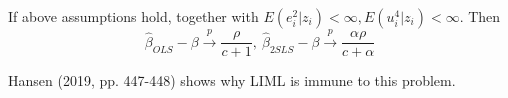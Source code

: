 \begin{mdframed}[backgroundcolor=blue!5] 
\begin{theorem}
If above assumptions hold, together with $E(e_i^2|z_i)<\infty, E(u_i^4|z_i)<\infty$. Then 
\[
\hat{\beta}_{OLS}-\beta\xrightarrow{p}\frac{\rho}{c+1},\   \hat{\beta}_{2SLS}-\beta\xrightarrow{p}\frac{\alpha\rho}{c+\alpha}
\]
\end{theorem}
\end{mdframed}
Hansen (2019, pp. 447-448) shows why LIML is immune to this problem. 

